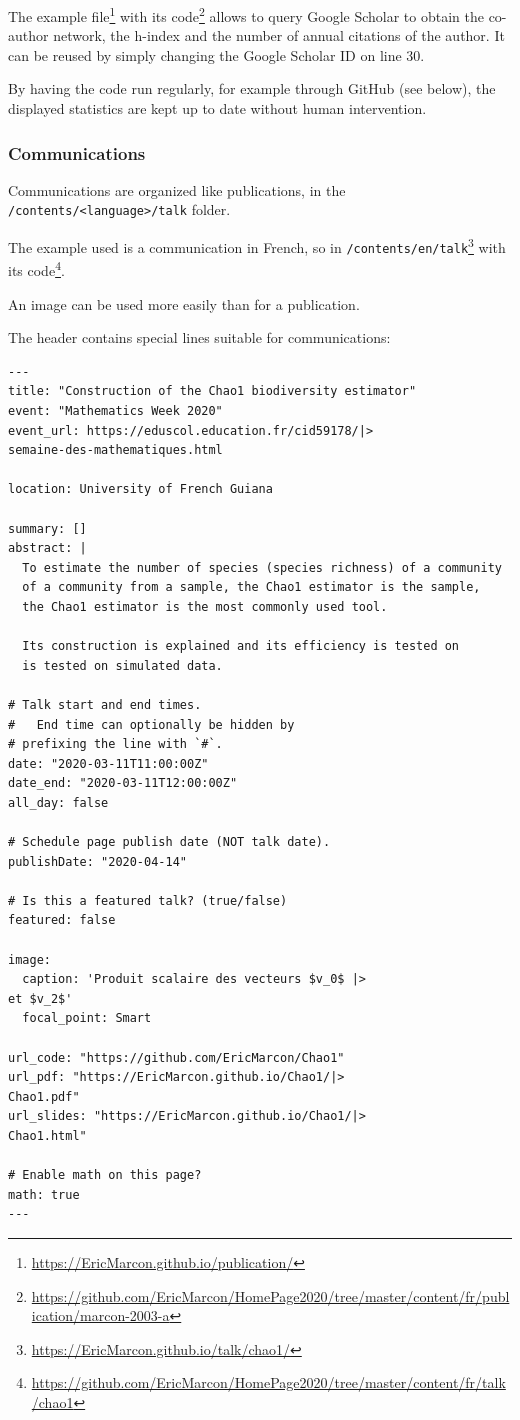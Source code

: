 \documentclass[
  12pt,
  american,
  a4paper,
  extrafontsizes,onecolumn,openright
  ]{memoir}
\begin{document}
The example file\footnote{\url{https://EricMarcon.github.io/publication/}} with its code\footnote{\url{https://github.com/EricMarcon/HomePage2020/tree/master/content/fr/publication/marcon-2003-a}} allows to query Google Scholar to obtain the co-author network, the h-index and the number of annual citations of the author.
It can be reused by simply changing the Google Scholar ID on line 30.

By having the code run regularly, for example through GitHub (see below), the displayed statistics are kept up to date without human intervention.

\hypertarget{communications}{%
\subsubsection{Communications}\label{communications}}

Communications are organized like publications, in the \texttt{/contents/\textless{}language\textgreater{}}\break\texttt{/talk} folder.

The example used is a communication in French, so in \texttt{/contents/en/talk}\footnote{\url{https://EricMarcon.github.io/talk/chao1/}} with its code\footnote{\url{https://github.com/EricMarcon/HomePage2020/tree/master/content/fr/talk/chao1}}.

An image can be used more easily than for a publication.

The header contains special lines suitable for communications:

\begin{verbatim}
---
title: "Construction of the Chao1 biodiversity estimator"
event: "Mathematics Week 2020"
event_url: https://eduscol.education.fr/cid59178/|>
semaine-des-mathematiques.html

location: University of French Guiana

summary: []
abstract: |
  To estimate the number of species (species richness) of a community 
  of a community from a sample, the Chao1 estimator is the sample, 
  the Chao1 estimator is the most commonly used tool.

  Its construction is explained and its efficiency is tested on
  is tested on simulated data.

# Talk start and end times.
#   End time can optionally be hidden by 
# prefixing the line with `#`.
date: "2020-03-11T11:00:00Z"
date_end: "2020-03-11T12:00:00Z"
all_day: false

# Schedule page publish date (NOT talk date).
publishDate: "2020-04-14"

# Is this a featured talk? (true/false)
featured: false

image:
  caption: 'Produit scalaire des vecteurs $v_0$ |>
et $v_2$'
  focal_point: Smart

url_code: "https://github.com/EricMarcon/Chao1"
url_pdf: "https://EricMarcon.github.io/Chao1/|>
Chao1.pdf"
url_slides: "https://EricMarcon.github.io/Chao1/|>
Chao1.html"

# Enable math on this page?
math: true
---
\end{verbatim}
\end{document}
